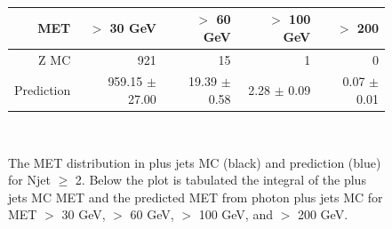 \begin{figure}[hbt]
  \begin{center}
	\\ \medskip
    \begin{tabular}{r|r|r|r|r}
      MET        & $>$ 30 GeV       & $>$ 60 GeV        & $>$ 100 GeV       & $>$ 200  \\ \hline
	  Z MC       &   921               &    15               &     1               &     0 \\
	  Prediction & 959.15 $\pm$  27.00 &  19.39 $\pm$   0.58 &   2.28 $\pm$   0.09 &   0.07 $\pm$   0.01 \\
	  

    \end{tabular}
	\\ \medskip
    \caption{The MET distribution in \Z plus jets MC (black) and prediction (blue) for Njet $\ge$ 2. 
	  Below the plot is tabulated the integral of the \Z plus jets MC MET and the predicted 
	  MET from photon plus jets MC for 
	  MET $>$ 30 GeV, $>$ 60 GeV, $>$ 100 GeV, and $>$ 200 GeV. 
	}
    \label{fig:mcclosurepho}
  \end{center}
\end{figure}




